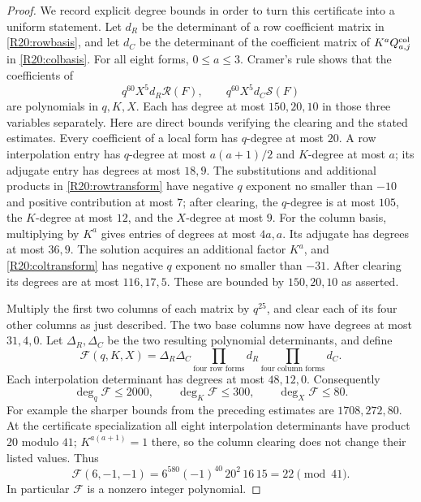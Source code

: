 \documentclass[11pt,a4paper]{article}
\theoremstyle{definition}\newtheorem{definition}{Definition}
\begin{document}
\begin{proof}
We record explicit degree bounds in order to turn this certificate
into a uniform statement. Let $d_R$ be the determinant of a row
coefficient matrix in \eqref{R20:rowbasis}, and let $d_C$ be the
determinant of the coefficient matrix of
$K^a Q^{\rm col}_{a,j}$ in \eqref{R20:colbasis}.
For all eight forms, $0\leq a\leq3$. Cramer's rule shows that
the coefficients of
\[
 q^{60}X^5d_R\mathcal R(F),\qquad
 q^{60}X^5d_C\mathcal S(F)
\]
are polynomials in $q,K,X$. Each has degree at most
$150,20,10$ in those three variables separately. Here are direct
bounds verifying the clearing and the stated estimates.
Every coefficient of a local form has $q$-degree at most $20$.
A row interpolation entry has $q$-degree at most $a(a+1)/2$
and $K$-degree at most $a$; its adjugate entry has degrees at most
$18,9$. The substitutions and additional products in
\eqref{R20:rowtransform} have negative $q$ exponent no smaller
than $-10$ and positive contribution at most $7$; after clearing,
the $q$-degree is at most $105$, the $K$-degree at most $12$,
and the $X$-degree at most $9$.
For the column basis, multiplying by $K^a$ gives entries of degrees
at most $4a,a$. Its adjugate has degrees at most $36,9$.
The solution acquires an additional factor $K^a$, and
\eqref{R20:coltransform} has negative $q$ exponent no smaller than
$-31$. After clearing its degrees are at most $116,17,5$.
These are bounded by $150,20,10$ as asserted.

Multiply the first two columns of each matrix by $q^{25}$,
and clear each of its four other columns as just described.
The two base columns now have degrees at most $31,4,0$.
Let $\Delta_R,\Delta_C$ be the two resulting polynomial determinants,
and define
\[
 \mathscr F(q,K,X)=\Delta_R\Delta_C
                  \prod_{\text{four row forms}}d_R
                  \prod_{\text{four column forms}}d_C.
\]
Each interpolation determinant has degrees at most $48,12,0$.
Consequently
\begin{equation}\label{R20:degrees}
 \deg_q\mathscr F\leq2000,\qquad
 \deg_K\mathscr F\leq300,\qquad
 \deg_X\mathscr F\leq80.
\end{equation}
For example the sharper bounds from the preceding estimates are
$1708,272,80$. At the certificate specialization all eight
interpolation determinants have product $20$ modulo $41$;
$K^{a(a+1)}=1$ there, so the column clearing does not change their
listed values. Thus
\[
 \mathscr F(6,-1,-1)
 =6^{580}(-1)^{40}\,20^2\,16\,15=22\pmod{41}.
\]
In particular $\mathscr F$ is a nonzero integer polynomial.


\end{proof}
\end{document}
